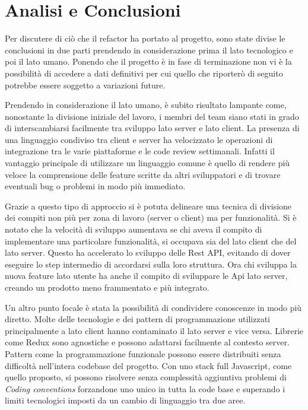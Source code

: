 \chapter{Analisi e Conclusioni}
\label{cha:intro}
\vspace{5mm}

Per discutere di ciò che il refactor ha portato al progetto, sono state divise le conclusioni in due parti prendendo in considerazione prima il lato tecnologico e poi il lato umano. Ponendo che il progetto è in fase di terminazione non vi è la possibilità di accedere a dati definitivi per cui quello che riporterò di seguito potrebbe essere soggetto a variazioni future.\vspace{5mm}

Prendendo in considerazione il lato umano, è subito risultato lampante come, nonostante la divisione iniziale del lavoro, i membri del team siano stati in grado di interscambiarsi facilmente tra sviluppo lato server e lato client. La presenza di una linguaggio condiviso tra client e server ha velocizzato le operazioni di integrazione tra le varie piattaforme e le code review settimanali. Infatti il vantaggio principale di utilizzare un linguaggio comune è quello di rendere più veloce la comprensione delle feature scritte da altri sviluppatori e di trovare eventuali bug o problemi in modo più immediato.\vspace{5mm}

Grazie a questo tipo di approccio si è potuta delineare una tecnica di divisione dei compiti non più per zona di lavoro (server o client) ma per funzionalità. Si è notato che la velocità di sviluppo aumentava se chi aveva il compito di implementare una particolare funzionalità, si occupava sia del lato client che del lato server. Questo ha accelerato lo sviluppo delle Rest API, evitando di dover eseguire lo step intermedio di accordarsi sulla loro struttura. Ora chi sviluppa la nuova feature lato utente ha anche il compito di sviluppare le Api lato server, creando un prodotto meno frammentato e più integrato. \vspace{5mm}

Un altro punto focale è stata la possibilità di condividere conoscenze in modo più diretto. Molte delle tecnologie e dei pattern di programmazione utilizzati principalmente a lato client hanno contaminato il lato server e vice versa. Librerie come Redux sono agnostiche e possono adattarsi facilmente al contesto server. Pattern come la programmazione funzionale possono essere distribuiti senza difficoltà nell'intera codebase del progetto. Con uno stack full Javascript, come quello proposto, si possono risolvere senza complessità aggiuntiva problemi di \emph{Coding conventions} forzandone uno unico in tutta la code base e superando i limiti tecnologici imposti da un cambio di linguaggio tra due aree.\vspace{5mm}

